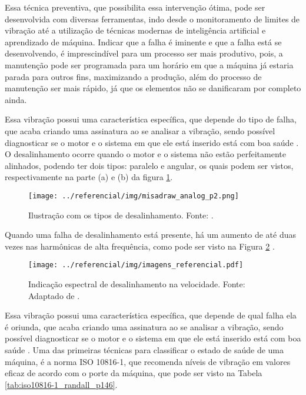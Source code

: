 \documentclass[a4paper]{ifacconf}
\begin{document}
Essa técnica preventiva, que possibilita essa intervenção ótima, pode ser desenvolvida com diversas ferramentas, indo desde o monitoramento
de limites de vibração até a utilização de técnicas modernas de inteligência artificial e aprendizado de máquina. Indicar que a falha é
iminente e que a falha está se desenvolvendo, é imprescindível para um processo ser mais produtivo, pois, a manutenção pode ser programada
para um horário em que a máquina já estaria parada para outros fins, maximizando a produção, além do processo de manutenção ser mais rápido, 
já que os elementos não se danificaram por completo ainda.

Essa vibração possui uma característica específica, que depende do tipo de falha, que acaba criando uma assinatura
ao se analisar a vibração, sendo possível diagnosticar se o motor e o sistema em que ele está inserido está com boa saúde \cite{Wu2013}.
O desalinhamento ocorre quando o motor e o sistema não estão perfeitamente alinhados, podendo ter dois tipos: paralelo e angular, os quais 
podem ser vistos, respectivamente na parte (a) e (b) da figura \ref{fig:misadraw_analog_p2}.

\begin{figure}[H]
  \begin{center}
      \texttt{[image: ../referencial/img/misadraw\_analog\_p2.png]}
  \end{center}
  \caption{Ilustração com os tipos de desalinhamento. Fonte: \cite{Sopcik2019}.}
  \label{fig:misadraw_analog_p2}
\end{figure}

Quando uma falha de desalinhamento está presente, há um aumento de até duas vezes nas harmônicas de alta 
frequência, como pode ser visto na Figura \ref{fig:misa_analog_p2} \cite{Sopcik2019}.

\begin{figure}[H]
  \begin{center}
      \texttt{[image: ../referencial/img/imagens\_referencial.pdf]}
  \end{center}
  \caption{Indicação espectral de desalinhamento na velocidade. Fonte: Adaptado de \cite{Sopcik2019}.}
  \label{fig:misa_analog_p2}
\end{figure}

Essa vibração possui uma característica específica, que depende de qual falha ela é oriunda, que acaba criando uma assinatura
ao se analisar a vibração, sendo possível diagnosticar se o motor e o sistema em que ele está inserido está com boa saúde \cite{Wu2013}.
Uma das primeiras técnicas para classificar o estado de saúde de uma máquina, é a norma ISO 10816-1, que recomenda níveis de vibração 
em valores eficaz de acordo com o porte da máquina, que pode ser visto na Tabela \ref{tab:iso10816-1_randall_p146}.
\end{document}
